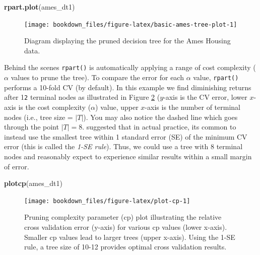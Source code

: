 \documentclass[]{krantz}
\makeatletter
\newenvironment{Shaded}{\begin{snugshade}}{\end{snugshade}}
\newcommand{\KeywordTok}[1]{\textcolor[rgb]{0.27,0.27,0.27}{\textbf{#1}}}
\newcommand{\NormalTok}[1]{#1}
\newenvironment{kframe}{%
\medskip{}
\setlength{\fboxsep}{.8em}
 \def\at@end@of@kframe{}%
 \ifinner\ifhmode%
  \def\at@end@of@kframe{\end{minipage}}%
  \begin{minipage}{\columnwidth}%
 \fi\fi%
 \def\FrameCommand##1{\hskip\@totalleftmargin \hskip-\fboxsep
 \colorbox{shadecolor}{##1}\hskip-\fboxsep
     \hskip-\linewidth \hskip-\@totalleftmargin \hskip\columnwidth}%
 \MakeFramed {\advance\hsize-\width
   \@totalleftmargin\z@ \linewidth\hsize
   \@setminipage}}%
 {\par\unskip\endMakeFramed%
 \at@end@of@kframe}
\renewenvironment{Shaded}{\begin{kframe}}{\end{kframe}}
\makeatother
\begin{document}
\begin{Shaded}
\begin{Highlighting}[]
\KeywordTok{rpart.plot}\NormalTok{(ames_dt1)}
\end{Highlighting}
\end{Shaded}

\begin{figure}

{\centering \texttt{[image: bookdown\_files/figure-latex/basic-ames-tree-plot-1]} 

}

\caption{Diagram displaying the pruned decision tree for the Ames Housing data.}\label{fig:basic-ames-tree-plot}
\end{figure}

Behind the scenes \texttt{rpart()} is automatically applying a range of cost complexity (\(\alpha\) values to prune the tree). To compare the error for each \(\alpha\) value, \texttt{rpart()} performs a 10-fold CV (by default). In this example we find diminishing returns after 1\texttt{2} terminal nodes as illustrated in Figure \ref{fig:plot-cp} (\(y\)-axis is the CV error, lower \(x\)-axis is the cost complexity (\(\alpha\)) value, upper \(x\)-axis is the number of terminal nodes (i.e., tree size = \(\vert T \vert\)). You may also notice the dashed line which goes through the point \(\vert T \vert = 8\). \citet{breiman2017classification} suggested that in actual practice, its common to instead use the smallest tree within 1 standard error (SE) of the minimum CV error (this is called the \emph{1-SE rule}). Thus, we could use a tree with 8 terminal nodes and reasonably expect to experience similar results within a small margin of error.

\begin{Shaded}
\begin{Highlighting}[]
\KeywordTok{plotcp}\NormalTok{(ames_dt1)}
\end{Highlighting}
\end{Shaded}

\begin{figure}

{\centering \texttt{[image: bookdown\_files/figure-latex/plot-cp-1]} 

}

\caption{Pruning complexity parameter (cp) plot illustrating the relative cross validation error (y-axis) for various cp values (lower x-axis). Smaller cp values lead to larger trees (upper x-axis). Using the 1-SE rule, a tree size of 10-12 provides optimal cross validation results.}\label{fig:plot-cp}
\end{figure}
\end{document}
